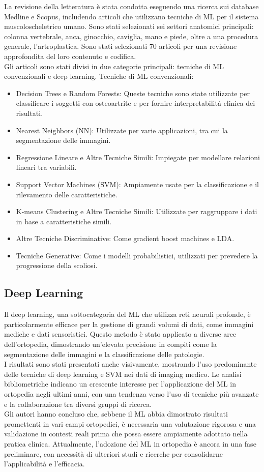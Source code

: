 La revisione della letteratura è stata condotta eseguendo una ricerca sui database Medline e Scopus, includendo articoli che utilizzano tecniche di ML per il sistema muscoloscheletrico umano. Sono stati selezionati sei settori anatomici principali: colonna vertebrale, anca, ginocchio, caviglia, mano e piede, oltre a una procedura generale, l'artroplastica. Sono stati selezionati 70 articoli per una revisione approfondita del loro contenuto e codifica.\\
Gli articoli sono stati divisi in due categorie principali: tecniche di ML convenzionali e deep learning.
Tecniche di ML convenzionali:
\begin{itemize}
\item Decision Trees e Random Forests: Queste tecniche sono state utilizzate per classificare i soggetti con osteoartrite e per fornire interpretabilità clinica dei risultati.
\item Nearest Neighbors (NN): Utilizzate per varie applicazioni, tra cui la segmentazione delle immagini.
\item Regressione Lineare e Altre Tecniche Simili: Impiegate per modellare relazioni lineari tra variabili.
\item Support Vector Machines (SVM): Ampiamente usate per la classificazione e il rilevamento delle caratteristiche.
\item K-means Clustering e Altre Tecniche Simili: Utilizzate per raggruppare i dati in base a caratteristiche simili.
\item Altre Tecniche Discriminative: Come gradient boost machines e LDA.
\item Tecniche Generative: Come i modelli probabilistici, utilizzati per prevedere la progressione della scoliosi.
\end{itemize}


\subsection{Deep Learning}
Il deep learning, una sottocategoria del ML che utilizza reti neurali profonde, è particolarmente efficace per la gestione di grandi volumi di dati, come immagini mediche e dati sensoristici. Questo metodo è stato applicato a diverse aree dell'ortopedia, dimostrando un'elevata precisione in compiti come la segmentazione delle immagini e la classificazione delle patologie.\\
I risultati sono stati presentati anche visivamente, mostrando l'uso predominante delle tecniche di deep learning e SVM nei dati di imaging medico. Le analisi bibliometriche indicano un crescente interesse per l'applicazione del ML in ortopedia negli ultimi anni, con una tendenza verso l'uso di tecniche più avanzate e la collaborazione tra diversi gruppi di ricerca.\\
Gli autori hanno concluso che, sebbene il ML abbia dimostrato risultati promettenti in vari campi ortopedici, è necessaria una valutazione rigorosa e una validazione in contesti reali prima che possa essere ampiamente adottato nella pratica clinica. Attualmente, l'adozione del ML in ortopedia è ancora in una fase preliminare, con necessità di ulteriori studi e ricerche per consolidarne l'applicabilità e l'efficacia.


